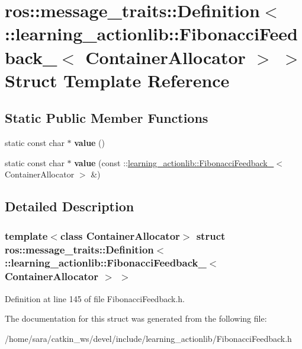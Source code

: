 \hypertarget{structros_1_1message__traits_1_1Definition_3_01_1_1learning__actionlib_1_1FibonacciFeedback___3_01ContainerAllocator_01_4_01_4}{}\section{ros\+:\+:message\+\_\+traits\+:\+:Definition$<$ \+:\+:learning\+\_\+actionlib\+:\+:Fibonacci\+Feedback\+\_\+$<$ Container\+Allocator $>$ $>$ Struct Template Reference}
\label{structros_1_1message__traits_1_1Definition_3_01_1_1learning__actionlib_1_1FibonacciFeedback___3_01ContainerAllocator_01_4_01_4}
\subsection*{Static Public Member Functions}
\begin{DoxyCompactItemize}
\item 
\mbox{\label{structros_1_1message__traits_1_1Definition_3_01_1_1learning__actionlib_1_1FibonacciFeedback___3_01ContainerAllocator_01_4_01_4_a09eb33f9953926f5a3612a5cce66a6b0}} 
static const char $\ast$ {\bfseries value} ()
\item 
\mbox{\label{structros_1_1message__traits_1_1Definition_3_01_1_1learning__actionlib_1_1FibonacciFeedback___3_01ContainerAllocator_01_4_01_4_a804d5fbc30bcbb454aa2f3ea3c4cdb20}} 
static const char $\ast$ {\bfseries value} (const \+::\hyperlink{structlearning__actionlib_1_1FibonacciFeedback__}{learning\+\_\+actionlib\+::\+Fibonacci\+Feedback\+\_\+}$<$ Container\+Allocator $>$ \&)
\end{DoxyCompactItemize}


\subsection{Detailed Description}
\subsubsection*{template$<$class Container\+Allocator$>$\newline
struct ros\+::message\+\_\+traits\+::\+Definition$<$ \+::learning\+\_\+actionlib\+::\+Fibonacci\+Feedback\+\_\+$<$ Container\+Allocator $>$ $>$}



Definition at line 145 of file Fibonacci\+Feedback.\+h.



The documentation for this struct was generated from the following file\+:\begin{DoxyCompactItemize}
\item 
/home/sara/catkin\+\_\+ws/devel/include/learning\+\_\+actionlib/Fibonacci\+Feedback.\+h\end{DoxyCompactItemize}

